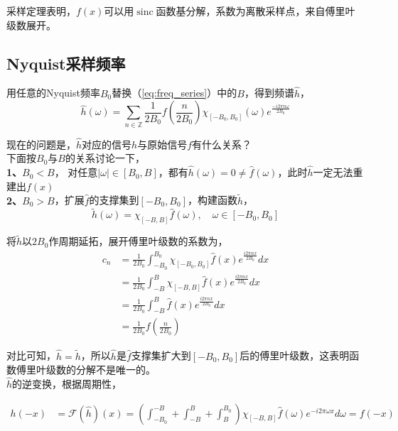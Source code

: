 采样定理表明，$f(x)$可以用$\mathop{sinc}$函数基分解，系数为离散采样点，来自傅里叶级数展开。

\subsection{Nyquist采样频率}
	
	用任意的Nyquist频率$B_0$替换（\ref{eq:freq_series}）中的$B$，得到频谱$\hat{h}$，
	$$
		\hat{h}(\omega) = \sum_{n \in \mathbb{Z}}\frac{1}{2B_0}f\left(\frac{n}{2B_0}\right)
		\chi_{[-B_0,B_0]}(\omega)
		e^{\frac{-i2\pi  n \omega}{2B_0}}
	$$

	现在的问题是，$\hat{h}$对应的信号$h$与原始信号$f$有什么关系？\\

	下面按$B_0$与$B$的关系讨论一下，\\

	\textbf{1、$B_0 < B$}， 对任意$|\omega| \in [B_0,B]$，都有$\hat{h}(\omega) =0 \ne \hat{f}(\omega)$，此时$\hat{h}$一定无法重建出$f(x)$\\

	\textbf{2、$B_0 > B$}，扩展$\hat{f}$的支撑集到$[-B_0,B_0]$，构建函数$\tilde{h}$，
	$$
		\tilde{h}(\omega) = \chi_{[-B,B]}\hat{f}(\omega), \quad\omega \in [-B_0, B_0] 
	$$

	将$\tilde{h}$以$2B_0$作周期延拓，展开傅里叶级数的系数为，
	\begin{align*}
		c_n
			&= \frac{1}{2B_0}\int_{-B_0}^{B_0} \chi_{[-B_0,B_0]}\hat{f}(x) e^{\frac{i2\pi nx}{2B_0}}dx\\
			&= \frac{1}{2B_0}\int_{-B}^{B} \chi_{[-B,B]}\hat{f}(x) e^{\frac{i2\pi nx}{2B_0}}dx\\
			&= \frac{1}{2B_0}\int_{-B}^{B} \hat{f}(x) e^{\frac{i2\pi nx}{2B_0}}dx\\
			&= \frac{1}{2B_0}f\left(\frac{n}{2B_0}\right)
	\end{align*}

	对比可知，$\hat{h} = \tilde{h}$，所以$\hat{h}$是$\hat{f}$支撑集扩大到$[-B_0,B_0]$后的傅里叶级数，这表明函数傅里叶级数的分解不是唯一的。\\

	$\hat{h}$的逆变换，根据周期性，

	\begin{align*}
		h(-x) &= \mathcal{F}(\hat{h})(x) 
			= \left(\int_{-B_0}^{-B} + \int_{-B}^{B} + \int_{B}^{B_0} \right)
			\chi_{[-B,B]}\hat{f}(\omega) e^{-i2\pi \omega x}d\omega
			 = f(-x)
	\end{align*}
	
